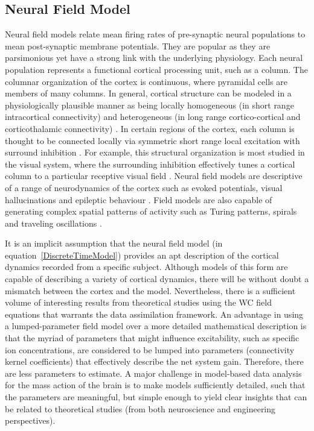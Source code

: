 \documentclass[review,authoryear,3p]{elsarticle}
\begin{document}
\subsection{Neural Field Model}\label{NeuralModelSection} 
Neural field models relate mean firing rates of pre-synaptic neural populations to mean post-synaptic membrane potentials. They are popular as they are parsimonious yet have a strong link with the underlying physiology. Each neural population represents a functional cortical processing unit, such as a column. The columnar organization of the cortex is continuous, where pyramidal cells are members of many columns. In general, cortical structure can be modeled in a physiologically plausible manner as being locally homogeneous (in short range intracortical connectivity) and heterogeneous (in long range cortico-cortical and corticothalamic connectivity) \citep{Jirsa2009,Qubbaj2007}. In certain regions of the cortex, each column is thought to be connected locally via symmetric short range local excitation with surround inhibition \citep{Braitenberg1998}. For example, this structural organization is most studied in the visual system, where the surrounding inhibition effectively tunes a cortical column to a particular receptive visual field \citep{Sullivan2006}. Neural field models are descriptive of a range of neurodynamics of the cortex such as evoked potentials, visual hallucinations and epileptic behaviour \citep{David2003,Bressloff2001,Breakspear2006}. Field models are also capable of generating complex spatial patterns of activity such as Turing patterns, spirals and traveling oscillations \citep{Amari1977,Coombes2005,Coombes2007}.

It is an implicit assumption that the neural field model (in equation~\ref{DiscreteTimeModel}) provides an apt description of the cortical dynamics recorded from a specific subject. Although models of this form are capable of describing a variety of cortical dynamics, there will be without doubt a mismatch between the cortex and the model. Nevertheless, there is a sufficient volume of interesting results from theoretical studies using the WC field equations that warrants the data assimilation framework. An advantage in using a lumped-parameter field model over a more detailed mathematical description is that the myriad of parameters that might influence excitability, such as specific ion concentrations, are considered to be lumped into parameters (connectivity kernel coefficients) that effectively describe the net system gain. Therefore, there are less parameters to estimate. A major challenge in model-based data analysis for the mass action of the brain is to make models sufficiently detailed, such that the parameters are meaningful, but simple enough to yield clear insights that can be related to theoretical studies (from both neuroscience and engineering perspectives).
\end{document}
